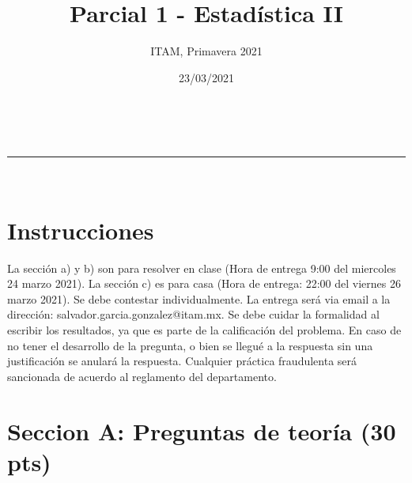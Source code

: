 \documentclass[addpoints]{exam}
\makeatletter
\newcommand{\linia}{\rule{\linewidth}{0.5pt}}
\theoremstyle{mytheor}
\renewcommand{\maketitle}{
    \begin{center}
    \vspace{2ex}
    {\huge \textsc{\@title}}
    \vspace{1ex}
    \\
    \linia\\
    \@author \hfill \@date
    \vspace{4ex}
    \end{center}
  }
\makeatother
\begin{document}
  
  \title{Parcial 1 - Estadística II}
  
  \author{ITAM, Primavera 2021}
  
  \date{23/03/2021}
  
  \maketitle
  
  \section*{Instrucciones}
  
La sección a) y b) son para resolver en clase (Hora de entrega 9:00 del miercoles 24 marzo 2021). La sección c) es para casa (Hora de entrega: 22:00 del viernes 26 marzo 2021). Se debe contestar individualmente. La entrega será via email a la dirección: salvador.garcia.gonzalez@itam.mx. Se debe cuidar la formalidad al escribir los resultados, ya que es parte de la calificación del problema. En caso de no tener el desarrollo de la pregunta, o bien se llegué a la respuesta sin una justificación se anulará la respuesta. Cualquier práctica fraudulenta será sancionada de acuerdo al reglamento del departamento.
  
  \section*{Seccion A: Preguntas de teoría (30 pts)}
  
\end{document}
